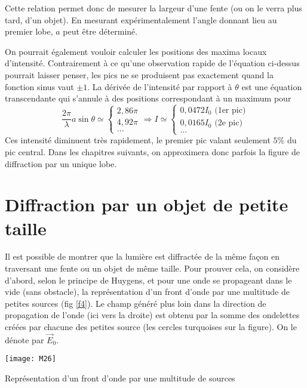 \noindent Cette relation permet donc de mesurer la largeur d'une fente (ou on le verra plus tard, d'un objet). En mesurant expérimentalement l'angle donnant lieu au premier lobe, $a$ peut être déterminé.

\noindent On pourrait également vouloir calculer les positions des maxima locaux d'intensité. Contrairement à ce qu'une observation rapide de l'équation ci-dessus pourrait laisser penser, les pics ne se produisent pas exactement quand la fonction sinus vaut $\pm1$. La dérivée de l'intensité par rapport à $\theta$ est une équation transcendante qui s'annule à des positions correspondant à un maximum pour 
\[
\frac{2\pi}{\lambda}a \sin\theta\simeq
\left\{
\begin{array}{c}
 2,86\pi\\
 4,92\pi\\
...
\end{array}
\right.
\Longrightarrow
I\simeq
\left\{
\begin{array}{c}
 0,0472I_0 \mbox{ (1er pic)}\\
 0,0165I_0 \mbox{ (2e pic)}\\   
  ...
\end{array}
\right.
\]
Ces intensité diminuent très rapidement, le premier pic valant seulement $5\%$ du pic central. Dans les chapitres suivants, on approximera donc parfois la figure de diffraction par un unique lobe.

\section{Diffraction par un objet de petite taille}

Il est possible de montrer que la lumière est diffractée de la même façon en traversant une fente ou un objet de même taille. Pour prouver cela, on considère d'abord, selon le principe de Huygens, et pour une onde se propageant dans le vide (sans obstacle), la représentation d'un front d'onde par une multitude de petites sources (fig \ref{f4}). Le champ généré plus loin dans la direction de propagation de l'onde (ici vers la droite) est obtenu par la somme des ondelettes créées par chacune des petites source (les cercles turquoises sur la figure). On le dénote par $\overset\rightarrow{E}_0$.

\begin{marginfigure}[0cm]
\texttt{[image: M26]}
\caption{Représentation d'un front d'onde par une multitude de sources}
\label{f4}
\end{marginfigure}

